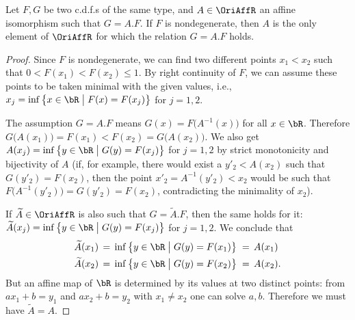 \begin{lemma}
  \label{lem:unique-affine-relation-cdf}
  \leanok
  Let $F, G$ be two c.d.f.s of the same type, and $A \in \OriAffR$
  an affine isomorphism such that $G = A.F$. If $F$ is nondegenerate,
  then $A$ is the only element of $\OriAffR$ for which the
  relation $G = A.F$ holds.
\end{lemma}
\begin{proof}
  Since $F$ is nondegenerate, we can find two different points $x_1 < x_2$
  such that $0 < F(x_1) < F(x_2) \le 1$. By right continuity of $F$, we can
  assume these points to be taken minimal with the given values, i.e.,
  $x_j = \inf \big\{ x \in \bR \; \big| \; F(x) = F(x_j) \big\}$ for
  $j=1,2$.

  The assumption $G = A.F$ means $G(x) = F \big( A^{-1}(x) \big)$ for all $x \in \bR$.
  Therefore $G \big( A(x_1) \big) = F(x_1) < F(x_2) = G \big( A(x_2) \big)$.
  We also get $A(x_j) = \inf \big\{ y \in \bR \; \big| \; G(y) = F(x_j) \big\}$ for
  $j=1,2$ by strict monotonicity and bijectivity of $A$
  (if, for example, there would exist a $y'_2 < A(x_2)$ such that $G(y'_2) = F(x_2)$,
  then the point $x'_2 = A^{-1}(y'_2) < x_2$ would be such that
  $F\big(A^{-1}(y'_2)\big) = G(y'_2) = F(x_2)$, contradicting the minimality of $x_2$).

  If $\widetilde{A} \in \OriAffR$ is also such that $G = \widetilde{A}.F$, then
  the same holds for it:
  $\widetilde{A}(x_j) = \inf \big\{ y \in \bR \; \big| \; G(y) = F(x_j) \big\}$
  for $j=1,2$. We conclude that
  \begin{align*}
    \widetilde{A}(x_1) \, = \; &
        \inf \big\{ y \in \bR \; \big| \; G(y) = F(x_1) \big\} \; = \, A(x_1) \\
    \widetilde{A}(x_2) \, = \; &
        \inf \big\{ y \in \bR \; \big| \; G(y) = F(x_2) \big\} \; = \, A(x_2) .
  \end{align*}
  But an affine map of $\bR$ is determined by its values at two distinct points:
  from $a x_1 + b = y_1$ and $a x_2 + b = y_2$ with $x_1 \ne x_2$ one can solve $a, b$.
  Therefore we must have $\widetilde{A} = A$.
\end{proof}

